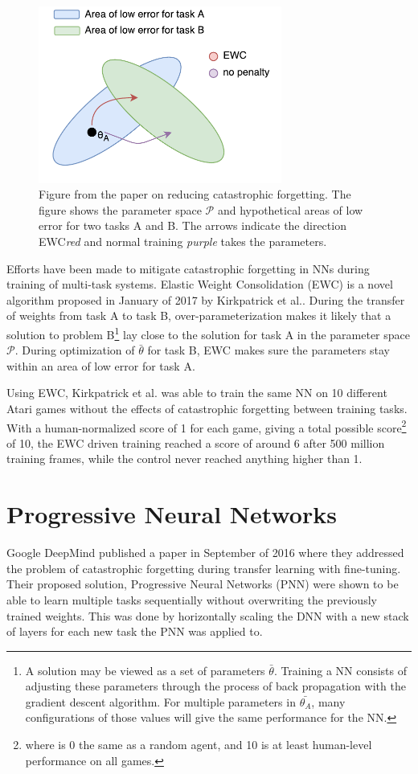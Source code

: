 \documentclass[a4paper,english]{report}
\begin{document}
\begin{figure}[]
    \label{fig:ewc}
    \centering
    \includegraphics[width=8cm]{figures/EWC.pdf}
    \caption{Figure from the paper on reducing catastrophic forgetting\cite{ewc}. The figure shows the parameter space \(\mathcal{P}\) and hypothetical areas of low error for two tasks A and B. The arrows indicate the direction EWC\textit{red} and normal training \textit{purple} takes the parameters.}
\end{figure}
\label{section:ewc}
Efforts have been made to mitigate catastrophic forgetting in NNs during training of multi-task systems. Elastic Weight Consolidation (EWC) is a novel algorithm proposed in January of 2017 by Kirkpatrick et al.\cite{ewc}. During the transfer of weights from task A to task B, over-parameterization makes it likely that a solution to problem B\footnote{A solution may be viewed as a set of parameters \(\bar{\theta}\). Training a NN consists of adjusting these parameters through the process of back propagation with the gradient descent algorithm. For multiple parameters in \(\bar{\theta_A}\), many configurations of those values will give the same performance for the NN.} lay close to the solution for task A in the parameter space \(\mathcal{P}\). During optimization of \(\bar{\theta}\) for task B, EWC makes sure the parameters stay within an area of low error for task A.

Using EWC, Kirkpatrick et al.\cite{ewc} was able to train the same NN on 10 different Atari games without the effects of catastrophic forgetting between training tasks. With a human-normalized score of 1 for each game, giving a total possible score\footnote{where is 0 the same as a random agent, and 10 is at least human-level performance on all games.} of 10, the EWC driven training reached a score of around 6 after 500 million training frames, while the control never reached anything higher than 1.


\section{Progressive Neural Networks}\label{pnn}
Google DeepMind published a paper in September of 2016\cite{progressiveneuralnetworks} where they addressed the problem of catastrophic forgetting during transfer learning with fine-tuning. Their proposed solution, Progressive Neural Networks (PNN) were shown to be able to learn multiple tasks sequentially without overwriting the previously trained weights. This was done by horizontally scaling the DNN with a new stack of layers for each new task the PNN was applied to.
\end{document}
